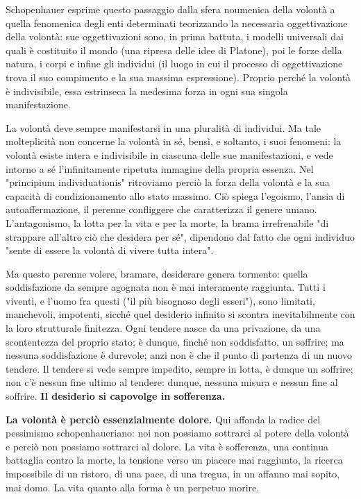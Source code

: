 Schopenhauer esprime questo passaggio dalla sfera noumenica della volontà a quella fenomenica degli enti determinati teorizzando la necessaria oggettivazione della volontà: sue oggettivazioni sono, in prima battuta, i modelli universali dai quali è costituito il mondo (una ripresa delle idee di Platone), poi le forze della natura, i corpi e infine gli individui (il luogo in cui il processo di oggettivazione trova il suo compimento e la sua massima espressione). Proprio perché la volontà è indivisibile, essa estrinseca la medesima forza in ogni sua singola manifestazione. 

La volontà deve sempre manifestarsi in una pluralità di individui. Ma tale molteplicità non concerne la volontà in sé, bensì, e soltanto, i suoi fenomeni: la volontà esiste intera e indivisibile in ciascuna delle sue manifestazioni, e vede intorno a sé l’infinitamente ripetuta immagine della propria essenza. Nel "principium individuationis" ritroviamo perciò la forza della volontà e la sua capacità di condizionamento allo stato massimo. Ciò spiega l’egoismo, l’ansia di autoaffermazione, il perenne confliggere che caratterizza il genere umano. L’antagonismo, la lotta per la vita e per la morte, la brama irrefrenabile "di strappare all’altro ciò che desidera per sé", dipendono dal fatto che ogni individuo "sente di essere la volontà di vivere tutta intera". 

Ma questo perenne volere, bramare, desiderare genera tormento: quella soddisfazione da sempre agognata non è mai interamente raggiunta. Tutti i viventi, e l’uomo fra questi ("il più bisognoso degli esseri"), sono limitati, manchevoli, impotenti, sicché quel desiderio infinito si scontra inevitabilmente con la loro strutturale finitezza. Ogni tendere nasce da una privazione, da una scontentezza del proprio stato; è dunque, finché non soddisfatto, un soffrire; ma nessuna soddisfazione è durevole; anzi non è che il punto di partenza di un nuovo tendere. Il tendere si vede sempre impedito, sempre in lotta, è dunque un soffrire; non c’è nessun fine ultimo al tendere: dunque, nessuna misura e nessun fine al soffrire. \textbf{Il desiderio si capovolge in sofferenza. }

\textbf{La volontà è perciò essenzialmente dolore.} Qui affonda la radice del pessimismo schopenhaueriano: noi non possiamo sottrarci al potere della volontà e perciò non possiamo sottrarci al dolore. La vita è sofferenza, una continua battaglia contro la morte, la tensione verso un piacere mai raggiunto, la ricerca impossibile di un ristoro, di una pace, di una tregua, in un affanno mai sopito, mai domo. La vita quanto alla forma è un perpetuo morire. 

